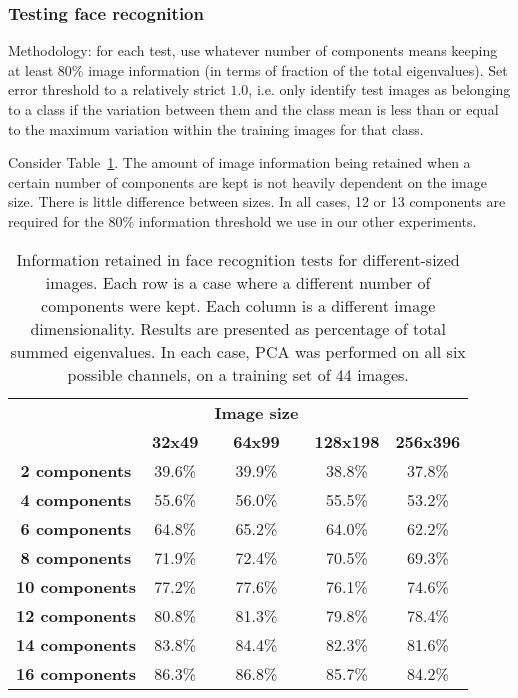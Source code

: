 \subsubsection{Testing face recognition}
\label{sec:pcaresults}

Methodology: for each test, use whatever number of components means keeping at least 80\% image information (in terms of fraction of the total eigenvalues). Set error threshold to a relatively strict $1.0$, i.e. only identify test images as belonging to a class if the variation between them and the class mean is less than or equal to the maximum variation within the training images for that class.

Consider Table~\ref{tbl:face-rec-1}. The amount of image information being retained when a certain number of components are kept is not heavily dependent on the image size. There is little difference between sizes. In all cases, 12 or 13 components are required for the 80\% information threshold we use in our other experiments.

\begin{table}[h!]
  \centering
  \begin{tabular}{c c c c c}
    \toprule
    \textbf{ } & \textbf{} & \textbf{Image size} & \textbf{} & \textbf{}\\
    \textbf{ } & \textbf{ 32x49 } & \textbf{ 64x99 } & \textbf{128x198} & \textbf{256x396}\\
    \midrule
    \textbf{2 components} & 39.6\% & 39.9\% & 38.8\% & 37.8\% \\
    \textbf{4 components} & 55.6\% & 56.0\% & 55.5\% & 53.2\% \\
    \textbf{6 components} & 64.8\% & 65.2\% & 64.0\% & 62.2\% \\
    \textbf{8 components} & 71.9\% & 72.4\% & 70.5\% & 69.3\% \\
    \textbf{10 components} & 77.2\% & 77.6\% & 76.1\% & 74.6\% \\
    \textbf{12 components} & 80.8\% & 81.3\% & 79.8\% & 78.4\% \\
    \textbf{14 components} & 83.8\% & 84.4\% & 82.3\% & 81.6\% \\
    \textbf{16 components} & 86.3\% & 86.8\% & 85.7\% & 84.2\% \\
    \bottomrule
  \end{tabular}
  \caption[Information retained in face recognition tests for different-sized images]{Information retained in face recognition tests for different-sized images. Each row is a case where a different number of components were kept. Each column is a different image dimensionality. Results are presented as percentage of total summed eigenvalues. In each case, PCA was performed on all six possible channels, on a training set of 44 images.}
  \label{tbl:face-rec-1}
\end{table}

